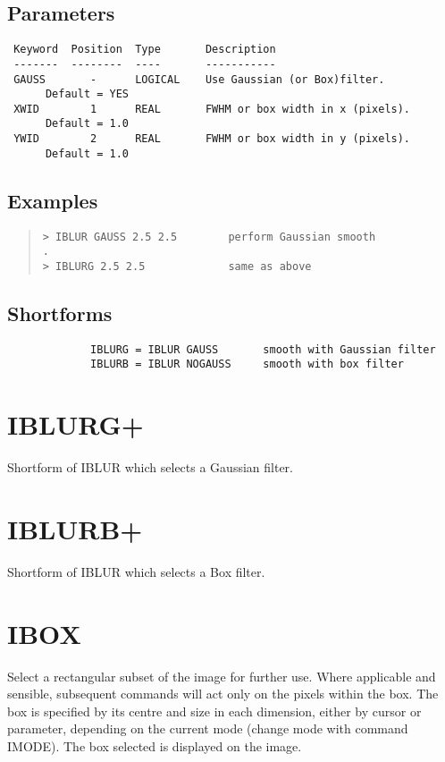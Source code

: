 \documentclass{book}
\renewcommand{\_}{{\tt\char'137}}     %
\begin{document}
\subsection{Parameters}
\begin{verbatim}
 Keyword  Position  Type       Description
 -------  --------  ----       -----------
 GAUSS       -      LOGICAL    Use Gaussian (or Box)filter.
      Default = YES
 XWID        1      REAL       FWHM or box width in x (pixels).
      Default = 1.0
 YWID        2      REAL       FWHM or box width in y (pixels).
      Default = 1.0

\end{verbatim}\subsection{Examples}
\begin{quote}\begin{verbatim}
> IBLUR GAUSS 2.5 2.5        perform Gaussian smooth
.
> IBLURG 2.5 2.5             same as above
\end{verbatim}\end{quote}
\subsection{Shortforms}
\begin{verbatim}
             IBLURG = IBLUR GAUSS       smooth with Gaussian filter
             IBLURB = IBLUR NOGAUSS     smooth with box filter
\end{verbatim}
\section{IBLURG+}
Shortform of IBLUR which selects a Gaussian filter.

\section{IBLURB+}
Shortform of IBLUR which selects a Box filter.

\section{IBOX}
Select a rectangular subset of the image for further use. Where
applicable and sensible, subsequent commands will act only on the
pixels within the box. The box is specified by its centre and
size in each dimension, either by cursor or parameter, depending
on the current mode (change mode with command IMODE). The box
selected is displayed on the image.
\end{document}
